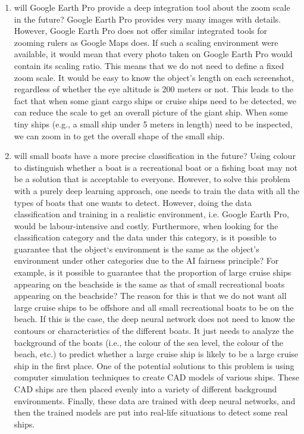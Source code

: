 \begin{enumerate}
    \item will Google Earth Pro provide a deep integration tool about the zoom scale in the future? Google Earth Pro provides very many images with details. However, Google Earth Pro does not offer similar integrated tools for zooming rulers as Google Maps does. If such a scaling environment were available, it would mean that every photo taken on Google Earth Pro would contain its scaling ratio. This means that we do not need to define a fixed zoom scale. It would be easy to know the object's length on each screenshot, regardless of whether the eye altitude is 200 meters or not. This leads to the fact that when some giant cargo ships or cruise ships need to be detected, we can reduce the scale to get an overall picture of the giant ship. When some tiny ships (e.g., a small ship under 5 meters in length) need to be inspected, we can zoom in to get the overall shape of the small ship.
    
    \item will small boats have a more precise classification in the future? Using colour to distinguish whether a boat is a recreational boat or a fishing boat may not be a solution that is acceptable to everyone. However, to solve this problem with a purely deep learning approach, one needs to train the data with all the types of boats that one wants to detect. However, doing the data classification and training in a realistic environment, i.e. Google Earth Pro, would be labour-intensive and costly. Furthermore, when looking for the classification category and the data under this category, is it possible to guarantee that the object‘s environment is the same as the object's environment under other categories due to the AI fairness principle? For example, is it possible to guarantee that the proportion of large cruise ships appearing on the beachside is the same as that of small recreational boats appearing on the beachside? The reason for this is that we do not want all large cruise ships to be offshore and all small recreational boats to be on the beach. If this is the case, the deep neural network does not need to know the contours or characteristics of the different boats. It just needs to analyze the background of the boats (i.e., the colour of the sea level, the colour of the beach, etc.) to predict whether a large cruise ship is likely to be a large cruise ship in the first place. One of the potential solutions to this problem is using computer simulation techniques to create CAD models of various ships. These CAD ships are then placed evenly into a variety of different background environments. Finally, these data are trained with deep neural networks, and then the trained models are put into real-life situations to detect some real ships.
    

\end{enumerate}
